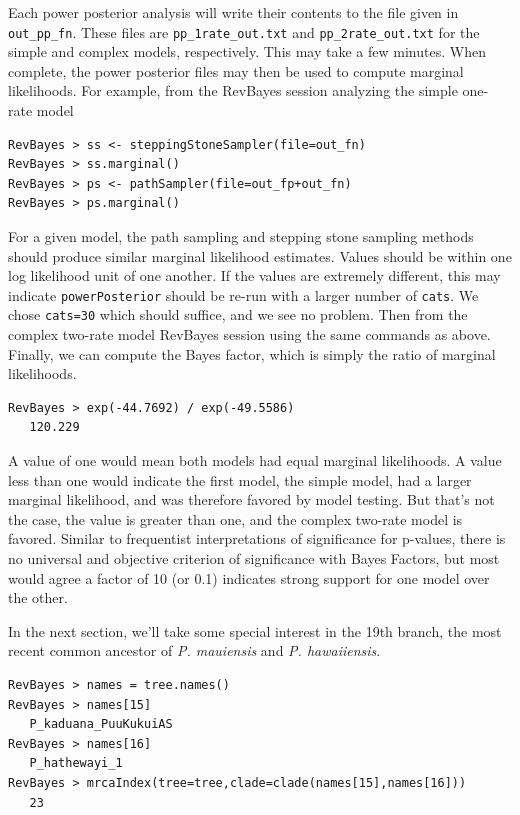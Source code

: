 \documentclass[11pt]{article}
\begin{document}
Each power posterior analysis will write their contents to the file given in {\tt out\_pp\_fn}.
These files are {\tt pp\_1rate\_out.txt} and {\tt pp\_2rate\_out.txt} for the simple and complex models, respectively.
This may take a few minutes.
When complete, the power posterior files may then be used to compute marginal likelihoods.
For example, from the RevBayes session analyzing the simple one-rate model

\begin{snugshade}
\begin{lstlisting}
RevBayes > ss <- steppingStoneSampler(file=out_fn)
RevBayes > ss.marginal() 
RevBayes > ps <- pathSampler(file=out_fp+out_fn)
RevBayes > ps.marginal() 
\end{lstlisting}
\end{snugshade}

For a given model, the path sampling and stepping stone sampling methods should produce similar marginal likelihood estimates.
Values should be within one log likelihood unit of one another.
If the values are extremely different, this may indicate {\tt powerPosterior} should be re-run with a larger number of {\tt cats}.
We chose {\tt cats=30} which should suffice, and we see no problem.
Then from the complex two-rate model RevBayes session using the same commands as above.
Finally, we can compute the Bayes factor, which is simply the ratio of marginal likelihoods.

\begin{snugshade}
\begin{lstlisting}
RevBayes > exp(-44.7692) / exp(-49.5586)
   120.229
\end{lstlisting}
\end{snugshade}

A value of one would mean both models had equal marginal likelihoods.
A value less than one would indicate the first model, the simple model, had a larger marginal likelihood, and was therefore favored by model testing.
But that's not the case, the value is greater than one, and the complex two-rate model is favored.
Similar to frequentist interpretations of significance for p-values, there is no universal and objective criterion of significance with Bayes Factors, but most would agree a factor of 10 (or 0.1) indicates strong support for one model over the other.

In the next section, we'll take some special interest in the 19th branch, the most recent common ancestor of {\it P. mauiensis} and {\it P. hawaiiensis}.
\begin{snugshade}
\begin{lstlisting}
RevBayes > names = tree.names()
RevBayes > names[15]
   P_kaduana_PuuKukuiAS
RevBayes > names[16]
   P_hathewayi_1
RevBayes > mrcaIndex(tree=tree,clade=clade(names[15],names[16]))
   23
\end{lstlisting}
\end{snugshade}
\end{document}
